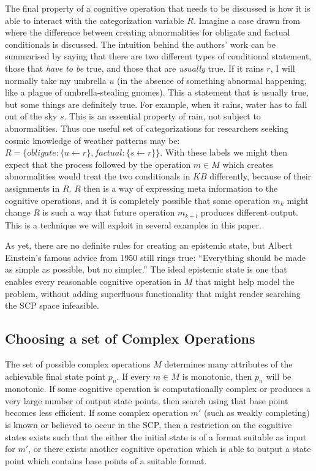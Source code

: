 \documentclass{article}
\begin{document}
The final property of a cognitive operation that needs to be discussed is how it is able to interact with the categorization variable $R$. Imagine a case drawn from \cite{saldanha2017weak} where the difference between creating abnormalities for obligate and factual conditionals is discussed. The intuition behind the authors' work can be summarised by saying that there are two different types of conditional statement, those that \textit{have to be} true, and those that are \textit{usually} true. If it rains $r$, I will normally take my umbrella $u$ (in the absence of something abnormal happening, like a plague of umbrella-stealing gnomes). This a statement that is usually true, but some things are definitely true. For example, when it rains, water has to fall out of the sky $s$. This is an essential property of rain, not subject to abnormalities. Thus one useful set of categorizations for researchers seeking cosmic knowledge of weather patterns may be: $R=\{obligate: \{u \leftarrow r\}, factual: \{s \leftarrow r\} \}$. With these labels we might then expect that the process followed by the operation $m \in M$ which creates abnormalities would treat the two conditionals in $KB$ differently, because of their assignments in $R$. $R$ then is a way of expressing meta information to the cognitive operations, and it is completely possible that some operation $m_k$ might change $R$ is such a way that future operation $m_{k+l}$ produces different output. This is a technique we will exploit in several examples in this paper.

As yet, there are no definite rules for creating an epistemic state, but Albert Einstein's famous advice from 1950 still rings true: ``Everything should be made as simple as possible, but no simpler.'' The ideal epistemic state is one that enables every reasonable cognitive operation in $M$ that might help model the problem, without adding superfluous functionality that might render searching the SCP space infeasible.
\subsection{Choosing a set of Complex Operations}
The set of possible complex operations $M$ determines many attributes of the achievable final state point $p_n$. If every $m \in M$ is monotonic, then $p_n$ will be monotonic. If some cognitive operation is computationally complex or produces a very large number of output state points, then search using that base point becomes less efficient. If some complex operation $m'$ (such as weakly completing) is known or believed to occur in the SCP, then a restriction on the cognitive states exists such that the either the initial state is of a format suitable as input for $m'$, or there exists another cognitive operation which is able to output a state point which contains base points of a suitable format.
\end{document}
